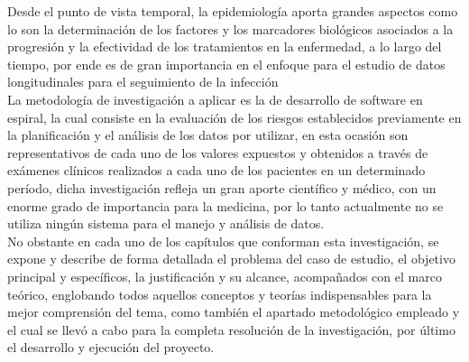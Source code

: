 	Desde el punto de vista temporal, la epidemiolog\'ia aporta grandes aspectos como lo son la determinaci\'on de los factores y los marcadores biol\'ogicos asociados a la progresi\'on y la efectividad de los tratamientos en la enfermedad, a lo largo del tiempo, por ende es de gran importancia en el enfoque para el estudio de datos longitudinales para el seguimiento de la infecci\'on \\

	La metodolog\'ia de investigaci\'on a aplicar es la de desarrollo de software en espiral, la cual consiste en la evaluaci\'on  de  los riesgos establecidos previamente en la planificaci\'on  y el an\'alisis de los datos por utilizar, en esta ocasi\'on son representativos de cada uno de los valores expuestos y obtenidos a trav\'es de ex\'amenes cl\'inicos realizados a cada uno de los pacientes en un determinado per\'iodo, dicha investigaci\'on  refleja un gran aporte cient\'ifico y m\'edico, con un enorme grado de importancia para la medicina, por lo tanto actualmente no se utiliza ning\'un sistema para el manejo y an\'alisis de datos. \\

	No obstante en cada uno de los cap\'itulos que conforman esta investigaci\'on, se expone y describe de forma detallada el problema del caso de estudio, el objetivo principal y espec\'ificos, la justificaci\'on y su alcance, acompa\~nados con el marco te\'orico, englobando todos aquellos conceptos y teor\'ias indispensables para la mejor comprensi\'on del tema, como tambi\'en el apartado metodol\'ogico empleado y el cual se llev\'o a cabo para la completa resoluci\'on de la investigaci\'on, por \'ultimo el desarrollo y ejecuci\'on del proyecto.
